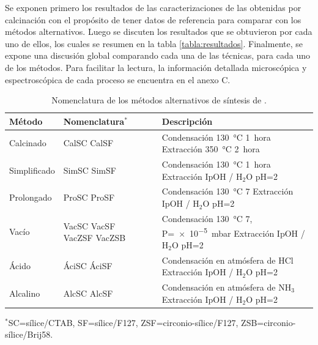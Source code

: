 		 Se exponen primero los resultados de las caracterizaciones de las \pdm\space obtenidas por calcinación con el propósito de tener datos de referencia para comparar con los métodos alternativos. Luego se discuten los resultados que se obtuvieron por cada uno de ellos, los cuales se resumen en la tabla \ref{tabla:resultados}. Finalmente, se expone una discusión global comparando cada una de las técnicas, para cada uno de los métodos. Para facilitar la lectura, la información detallada microscópica y espectroscópica de cada proceso se encuentra en el anexo C.
	 
	  	 \begin{table}[h!] 
		 	 \caption[Tratamientos alternativos de síntesis de \pdm]{Nomenclatura de los métodos alternativos de síntesis de \pdm.}
			 \begin{tabular}{>{\raggedright\arraybackslash}m{1.9cm}>{\centering\arraybackslash}m{1cm}>{\raggedright\arraybackslash}m{0.9cm}>{\raggedright\arraybackslash}m{6.62cm}} 
			 \toprule
				 Método   &  Nomenclatura$^*$&  & Descripción \\ \midrule
				 Calcinado & CalSC CalSF& &  Condensación \SI{130}{\celsius} \SI{1}{hora}\hspace{2cm} Extracción \SI{350}{\celsius} \SI{2}{hora}\hspace{2cm} \\ \midrule
				 Simplificado & SimSC SimSF& &  Condensación \SI{130}{\celsius} \SI{1}{hora}\hspace{2cm} Extracción IpOH / H$_2$O pH=2 \\ \midrule
				 Prolongado & ProSC ProSF& & Condensación \SI{130}{\celsius} \SI{7}{\text{días}}\hspace{2cm} Extracción IpOH / H$_2$O pH=2 \\ \midrule				
				 Vacío & VacSC VacSF VacZSF VacZSB& &  Condensación \SI{130}{\celsius} \SI{7}{\text{días}}, P=\SI{e-5}{\milli\bar}\hspace{2cm} Extracción IpOH / H$_2$O pH=2 \\ \midrule
				 Ácido & ÁciSC ÁciSF& &  Condensación en atmósfera de HCl\hspace{2cm} Extracción IpOH / H$_2$O pH=2 \\ \midrule
				 Alcalino & AlcSC AlcSF& & Condensación en atmósfera de NH$_3$\hspace{2cm} Extracción IpOH / H$_2$O pH=2 \\ 
				\bottomrule
				   \end{tabular}\vspace*{2pt}
		    	  	\footnotesize{$^*$SC=sílice/CTAB, SF=sílice/F127, ZSF=circonio-sílice/F127, ZSB=circonio-sílice/Brij58.}
				   	\label{tabla:tratamientos}
				   \end{table}
	
